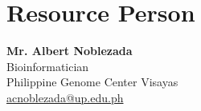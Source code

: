 \chapter{Resource Person}
\label{sec:appendix_resource_persons}

\newcommand{\resperson}[4]{\textbf{#1}\\#2\\#3\\\url{#4}}

\resperson{Mr. Albert Noblezada}{Bioinformatician}{Philippine Genome Center Visayas}{acnoblezada@up.edu.ph}